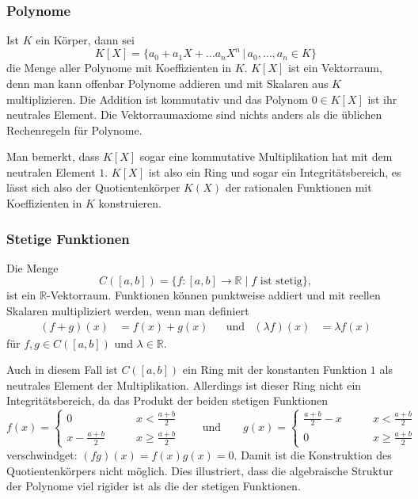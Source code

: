 \subsubsection{Polynome}
Ist $K$ ein Körper, dann sei
\[
K[X]
=
\{
a_0+a_1X+\dots a_nX^n\,|\, a_0,\dots,a_n\in K
\}
\]
die Menge aller Polynome mit Koeffizienten in $K$.
$K[X]$ ist ein Vektorraum, denn man kann offenbar Polynome addieren und
mit Skalaren aus $K$ multiplizieren.
Die Addition ist kommutativ und das Polynom $0\in K[X]$ ist ihr neutrales
Element.
Die Vektorraumaxiome sind nichts anders als die üblichen Rechenregeln
für Polynome.

Man bemerkt, dass $K[X]$ sogar eine kommutative Multiplikation hat
mit dem neutralen Element $1$.
$K[X]$ ist also ein Ring und sogar ein Integritätsbereich, es lässt sich
also der Quotientenkörper $K(X)$ der rationalen Funktionen mit Koeffizienten
in $K$ konstruieren.

\subsubsection{Stetige Funktionen}
Die Menge
\[
C([a,b])
=
\{ f\colon [a,b]\to \mathbb R\;|\; \text{$f$ ist stetig}\},
\]
ist ein $\mathbb R$-Vektorraum.
Funktionen können punktweise addiert und mit reellen Skalaren multipliziert
werden, wenn man definiert
\[
\begin{aligned}
(f+g)(x)&=f(x)+g(x)
&&\text{und}
&
(\lambda f)(x)&=\lambda f(x)
\end{aligned}
\]
für $f,g\in C([a,b])$ und $\lambda\in\mathbb R$.

Auch in diesem Fall ist $C([a,b])$ ein Ring mit der konstanten Funktion $1$
als neutrales Element der Multiplikation.
Allerdings ist dieser Ring nicht ein Integritätsbereich, da das Produkt der
beiden stetigen Funktionen
\[
f(x)
=
\begin{cases}
0&\qquad x<\displaystyle\frac{a+b}2\\
\displaystyle x-\frac{a+b}2&\qquad x\ge \displaystyle\frac{a+b}2
\end{cases}
\qquad\text{und}\qquad
g(x)
=
\begin{cases}
\displaystyle\frac{a+b}2-x&\qquad x<\displaystyle\frac{a+b}2\\
0&\qquad x\ge \displaystyle\frac{a+b}2
\end{cases}
\]
verschwindget: $(fg)(x)=f(x)g(x)=0$.
Damit ist die Konstruktion des Quotientenkörpers nicht möglich.
Dies illustriert, dass die algebraische Struktur der Polynome viel
rigider ist als die der stetigen Funktionen.

